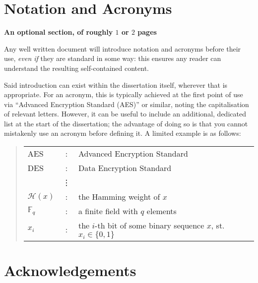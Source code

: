 \documentclass[ %
                    author={Dillon Keith Diep},
                supervisor={Dr. Carl Henrik Ek},
                    degree={MEng},
                     title={Assisted Content Generation for 3D Hair Geometry},
                  subtitle={[INCOMPLETE DRAFT, CONTAINS NOTES FROM RESEARCH]},
                      type={Research},
                      year={2014} ]{dissertation}
\begin{document}

\chapter*{Notation and Acronyms}

{\bf An optional section, of roughly $1$ or $2$ pages}
\vspace{1cm} 

\noindent
Any well written document will introduce notation and acronyms before
their use, {\em even if} they are standard in some way: this ensures 
any reader can understand the resulting self-contained content.  

Said introduction can exist within the dissertation itself, wherever 
that is appropriate.  For an acronym, this is typically achieved at 
the first point of use via ``Advanced Encryption Standard (AES)'' or 
similar, noting the capitalisation of relevant letters.  However, it 
can be useful to include an additional, dedicated list at the start 
of the dissertation; the advantage of doing so is that you cannot 
mistakenly use an acronym before defining it.  A limited example is 
as follows:

\begin{quote}
\noindent
\begin{tabular}{lcl}
AES                 &:     & Advanced Encryption Standard                                         \\
DES                 &:     & Data Encryption Standard                                             \\
                    &\vdots&                                                                      \\
${\mathcal H}( x )$ &:     & the Hamming weight of $x$                                            \\
${\mathbb  F}_q$    &:     & a finite field with $q$ elements                                     \\
$x_i$               &:     & the $i$-th bit of some binary sequence $x$, st. $x_i \in \{ 0, 1 \}$ \\
\end{tabular}
\end{quote}


\chapter*{Acknowledgements}
\end{document}
